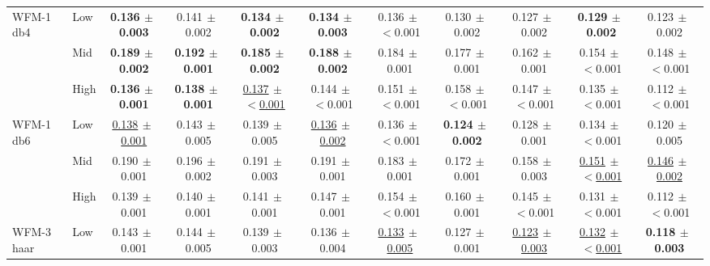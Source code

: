 \begin{table}[ht]
{\begin{tabular}{llccccccccc}
\midrule
\multirow{3}{*}{WFM-1 db4} & Low & \textbf{0.136{\scriptsize$\,\pm\,$0.003}} & 0.141{\scriptsize$\,\pm\,$0.002} & \textbf{0.134{\scriptsize$\,\pm\,$0.002}} & \textbf{0.134{\scriptsize$\,\pm\,$0.003}} & 0.136{\scriptsize$\,\pm\,$$<$0.001} & 0.130{\scriptsize$\,\pm\,$0.002} & 0.127{\scriptsize$\,\pm\,$0.002} & \textbf{0.129{\scriptsize$\,\pm\,$0.002}} & 0.123{\scriptsize$\,\pm\,$0.002} \\
 & Mid & \textbf{0.189{\scriptsize$\,\pm\,$0.002}} & \textbf{0.192{\scriptsize$\,\pm\,$0.001}} & \textbf{0.185{\scriptsize$\,\pm\,$0.002}} & \textbf{0.188{\scriptsize$\,\pm\,$0.002}} & 0.184{\scriptsize$\,\pm\,$0.001} & 0.177{\scriptsize$\,\pm\,$0.001} & 0.162{\scriptsize$\,\pm\,$0.001} & 0.154{\scriptsize$\,\pm\,$$<$0.001} & 0.148{\scriptsize$\,\pm\,$$<$0.001} \\
 & High & \textbf{0.136{\scriptsize$\,\pm\,$0.001}} & \textbf{0.138{\scriptsize$\,\pm\,$0.001}} & \underline{0.137{\scriptsize$\,\pm\,$$<$0.001}} & 0.144{\scriptsize$\,\pm\,$$<$0.001} & 0.151{\scriptsize$\,\pm\,$$<$0.001} & 0.158{\scriptsize$\,\pm\,$$<$0.001} & 0.147{\scriptsize$\,\pm\,$$<$0.001} & 0.135{\scriptsize$\,\pm\,$$<$0.001} & 0.112{\scriptsize$\,\pm\,$$<$0.001} \\
\midrule
\multirow{3}{*}{WFM-1 db6} & Low & \underline{0.138{\scriptsize$\,\pm\,$0.001}} & 0.143{\scriptsize$\,\pm\,$0.005} & 0.139{\scriptsize$\,\pm\,$0.005} & \underline{0.136{\scriptsize$\,\pm\,$0.002}} & 0.136{\scriptsize$\,\pm\,$$<$0.001} & \textbf{0.124{\scriptsize$\,\pm\,$0.002}} & 0.128{\scriptsize$\,\pm\,$0.001} & 0.134{\scriptsize$\,\pm\,$$<$0.001} & 0.120{\scriptsize$\,\pm\,$0.005} \\
 & Mid & 0.190{\scriptsize$\,\pm\,$0.001} & 0.196{\scriptsize$\,\pm\,$0.002} & 0.191{\scriptsize$\,\pm\,$0.003} & 0.191{\scriptsize$\,\pm\,$0.001} & 0.183{\scriptsize$\,\pm\,$0.001} & 0.172{\scriptsize$\,\pm\,$0.001} & 0.158{\scriptsize$\,\pm\,$0.003} & \underline{0.151{\scriptsize$\,\pm\,$$<$0.001}} & \underline{0.146{\scriptsize$\,\pm\,$0.002}} \\
 & High & 0.139{\scriptsize$\,\pm\,$0.001} & 0.140{\scriptsize$\,\pm\,$0.001} & 0.141{\scriptsize$\,\pm\,$0.001} & 0.147{\scriptsize$\,\pm\,$0.001} & 0.154{\scriptsize$\,\pm\,$$<$0.001} & 0.160{\scriptsize$\,\pm\,$0.001} & 0.145{\scriptsize$\,\pm\,$$<$0.001} & 0.131{\scriptsize$\,\pm\,$$<$0.001} & 0.112{\scriptsize$\,\pm\,$$<$0.001} \\
\midrule
\multirow{3}{*}{WFM-3 haar} & Low & 0.143{\scriptsize$\,\pm\,$0.001} & 0.144{\scriptsize$\,\pm\,$0.005} & 0.139{\scriptsize$\,\pm\,$0.003} & 0.136{\scriptsize$\,\pm\,$0.004} & \underline{0.133{\scriptsize$\,\pm\,$0.005}} & 0.127{\scriptsize$\,\pm\,$0.001} & \underline{0.123{\scriptsize$\,\pm\,$0.003}} & \underline{0.132{\scriptsize$\,\pm\,$$<$0.001}} & \textbf{0.118{\scriptsize$\,\pm\,$0.003}} \\

\end{tabular}}
\end{table}
